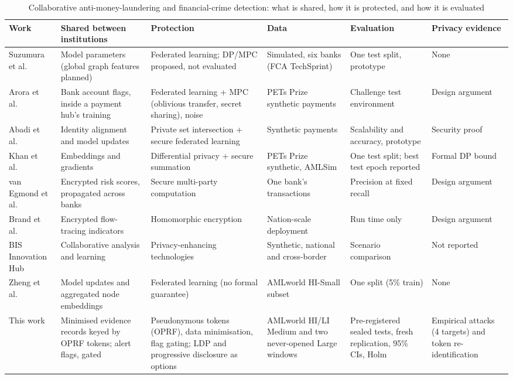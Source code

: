 \begin{table}[!t]
\centering
\caption{Collaborative anti-money-laundering and financial-crime detection: what is shared, how it is protected, and how it is evaluated}
\label{tab:related}
\footnotesize
\setlength{\tabcolsep}{3pt}
\begin{tabular}{*{6}{>{\raggedright\arraybackslash}p{2.55cm}}}
\hline
Work & Shared between institutions & Protection & Data & Evaluation & Privacy evidence \\
\hline
Suzumura et al.\ \cite{suzumura2019} & Model parameters (global graph features planned) & Federated learning; DP/MPC proposed, not evaluated & Simulated, six banks (FCA TechSprint) & One test split, prototype & None \\
Arora et al.\ \cite{arora2023} & Bank account flags, inside a payment hub's training & Federated learning + MPC (oblivious transfer, secret sharing), noise & PETs Prize synthetic payments & Challenge test environment & Design argument \\
Abadi et al.\ \cite{abadi2024starlit} & Identity alignment and model updates & Private set intersection + secure federated learning & Synthetic payments & Scalability and accuracy, prototype & Security proof \\
Khan et al.\ \cite{khan2024fedrd} & Embeddings and gradients & Differential privacy + secure summation & PETs Prize synthetic, AMLSim & One test split; best test epoch reported & Formal DP bound \\
van Egmond et al.\ \cite{vanegmond2024} & Encrypted risk scores, propagated across banks & Secure multi-party computation & One bank's transactions & Precision at fixed recall & Design argument \\
Brand et al.\ \cite{brand2023fintracer} & Encrypted flow-tracing indicators & Homomorphic encryption & Nation-scale deployment & Run time only & Design argument \\
BIS Innovation Hub \cite{bis2023aurora} & Collaborative analysis and learning & Privacy-enhancing technologies & Synthetic, national and cross-border & Scenario comparison & Not reported \\
Zheng et al.\ \cite{zheng2025} & Model updates and aggregated node embeddings & Federated learning (no formal guarantee) & AMLworld HI-Small subset \cite{altman2023} & One split (5\% train) & None \\
\hline
This work & Minimised evidence records keyed by OPRF tokens; alert flags, gated & Pseudonymous tokens (OPRF), data minimisation, flag gating; LDP and progressive disclosure as options & AMLworld HI/LI Medium and two never-opened Large windows \cite{altman2023} & Pre-registered sealed tests, fresh replication, 95\% CIs, Holm & Empirical attacks (4 targets) and token re-identification \\
\hline
\end{tabular}
\end{table}
